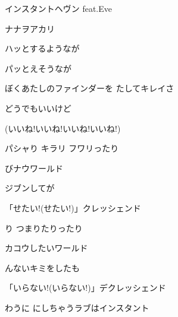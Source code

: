 \documentclass[a4paper,tate,twocolumn,12pt]{ltjtarticle}
\begin{document}
\thispagestyle{empty}

\begin{center}
{\LARGE インスタントヘヴン feat.Eve}

{\large ナナヲアカリ}
\end{center}

\vspace{1em}

\begin{flushleft}

\noindent\begin{minipage}{\linewidth}
ハッとするようなが

パッとえそうなが

ぼくあたしのファインダーを たしてキレイさ

どうでもいいけど
\end{minipage}

\vspace{2em}

\noindent\begin{minipage}{\linewidth}
(いいね!いいね!いいね!いいね!)
\end{minipage}

\vspace{2em}

\noindent\begin{minipage}{\linewidth}
パシャり キラリ フワリったり

びナウワールド

ジブンしてが

「せたい!(せたい!)」クレッシェンド
\end{minipage}

\vspace{2em}

\noindent\begin{minipage}{\linewidth}
り つまりたりったり

カコウしたいワールド

んないキミをしたも

「いらない!(いらない!)」デクレッシェンド
\end{minipage}

\vspace{2em}

\noindent\begin{minipage}{\linewidth}
わうに にしちゃうラブはインスタント


\end{minipage}
\end{flushleft}
\end{document}
